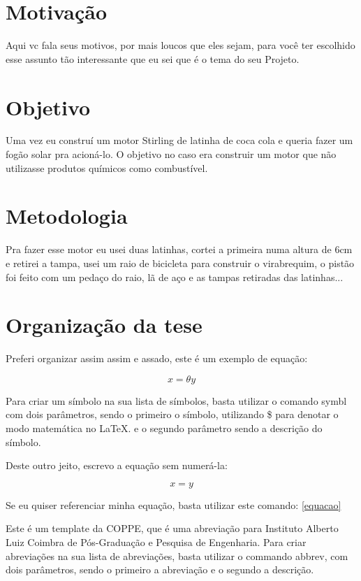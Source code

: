 \section{Motivaç{\~ a}o}

Aqui vc fala seus motivos, por mais loucos que eles sejam, para você ter escolhido esse assunto tão interessante que eu sei que é o tema do seu Projeto.

\section{Objetivo}

Uma vez eu construí um motor Stirling de latinha de coca cola e queria fazer um fogão solar pra acioná-lo. O objetivo no caso era construir um motor que não utilizasse produtos químicos como combustível.

\section{Metodologia}

Pra fazer esse motor eu usei duas latinhas, cortei a primeira numa altura de 6cm e retirei a tampa, usei um raio de bicicleta para construir o virabrequim, o pistão foi feito com um pedaço do raio, lã de aço e as tampas retiradas das latinhas...

\section{Organizaç{\~ a}o da tese}

Preferi organizar assim assim e assado, este é um exemplo de equação:

\begin{equation}\label{equacao}
    x = \theta y
\end{equation}

Para criar um símbolo na sua lista de símbolos, basta utilizar o comando symbl com dois parâmetros, sendo o primeiro o símbolo, utilizando \$ para denotar o modo matemática no LaTeX. e o segundo parâmetro sendo a descrição do símbolo.


Deste outro jeito, escrevo a equação sem numerá-la:

\begin{equation*}
    x = y
\end{equation*}

Se eu quiser referenciar minha equação, basta utilizar este comando: \ref{equacao}

Este é um template da COPPE, que é uma abreviação para Instituto Alberto Luiz Coimbra de Pós-Graduação e Pesquisa de Engenharia. Para criar abreviações na sua lista de abreviações, basta utilizar o commando abbrev, com dois parâmetros, sendo o primeiro a abreviação e o segundo a descrição.

